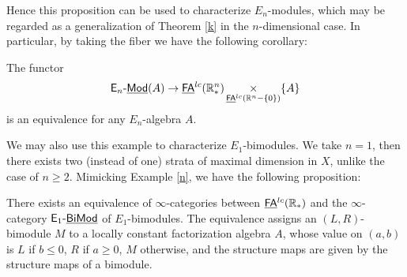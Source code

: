 \documentclass[twoside]{article}
\begin{document}
\begin{example}
    Hence this proposition can be used to characterize $E_n$-modules,
    which may be regarded as a generalization of Theorem \ref{k} in the
    $n$-dimensional case. In particular, by taking the fiber we have the following
    corollary:

    \begin{corollary}
        The functor $$\mathsf{E}_n\text{-}\underline{\smash{\mathsf{Mod}}}(A)\to\underline{\smash{\mathsf{FA}}}^{lc}(\mathbb{R}^n_*)\mathop{\operatorname{\times}}
        _{\underline{\smash{\mathsf{FA}}}^{lc}(\mathbb{R}^n-\{0\})}\{A\}$$ is an equivalence for any $E_n$-algebra $A$.
    \end{corollary}

    We may also use this example to characterize $E_1$-bimodules. We take $n=1$,
    then there exists two (instead of one) strata of maximal dimension in $X$,
    unlike the case of $n\ge 2$. Mimicking Example \ref{n}, we have the following proposition:

    \begin{proposition}
        There exists an equivalence of $\infty$-categories between $\underline{\smash{\mathsf{FA}}}^{lc}(\mathbb{R}_*)$
        and the $\infty$-category $\mathsf{E}_1\text{-}\underline{\smash{\mathsf{BiMod}}}$ of $E_1$-bimodules. The equivalence
        assigns an $(L,R)$-bimodule $M$ to a locally constant factorization algebra $A$,
        whose value on $(a,b)$ is $L$ if $b\le 0$, $R$ if $a\ge 0$, $M$ otherwise,
        and the structure maps are given by the structure maps of a bimodule.
    \end{proposition}
\end{example}
\end{document}
